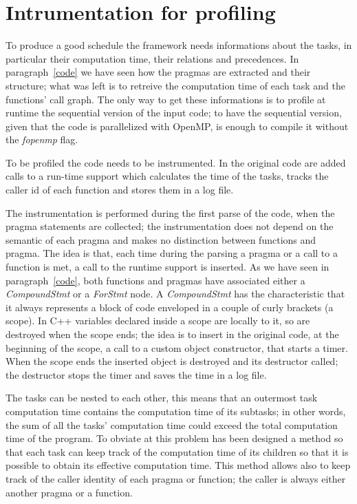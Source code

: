 \documentclass[a4paper,11pt,oneside]{book}
\begin{document}
\section{Intrumentation for profiling}

To produce a good schedule the framework needs informations about the tasks, in particular their computation time, their relations and precedences. In paragraph~\ref{code} we have seen how the pragmas are extracted and their structure; what was left is to retreive the computation time of each task and the functions’ call graph. The only way to get these informations is to profile at run\-time the sequential version of the input code; to have the sequential version, given that the code is parallelized with OpenMP, is enough to compile it without the \emph{\-fopenmp} flag. 

To be profiled the code needs to be instrumented. In the original code are added calls to a run-time support which calculates the time of the tasks, tracks the caller id of each function and stores them in a log file. 

The instrumentation is performed during the first parse of the code, when the pragma statements are collected; the instrumentation does not depend on the semantic of each pragma and makes no distinction between functions and pragma. The idea is that, each time during the parsing a pragma or a call to a function is met, a call to the run\-time support is inserted. As we have seen in paragraph~\ref{code}, both functions and pragmas have associated either a \emph{CompoundStmt} or a \emph{ForStmt} node. A \emph{CompoundStmt} has the characteristic that it always represents a block of code enveloped in a couple of curly brackets (a scope). In C++ variables declared inside a scope are locally to it, so are destroyed when the scope ends; the idea is to insert in the original code, at the beginning of the scope, a call to a custom object constructor, that starts a timer. When the scope ends the inserted object is destroyed and its destructor called; the destructor stops the timer and saves the time in a log file. 

The tasks can be nested to each other, this means that an outermost task computation time contains the computation time of its sub\-tasks; in other words, the sum of all the tasks’ computation time could exceed the total computation time of the program. To obviate at this problem has been designed a method so that each task can keep track of the computation time of its children so that it is possible to obtain its effective computation time. This method allows also to keep track of the caller identity of each pragma or function; the caller is always either another pragma or a function.
\end{document}
